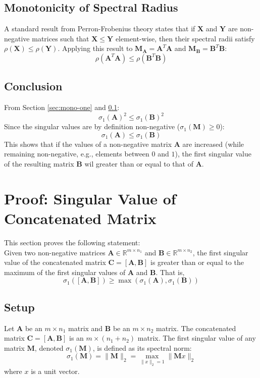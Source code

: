 \subsection{Monotonicity of Spectral Radius}
\label{sec:mono-three}
A standard result from Perron-Frobenius theory states that if $\mathbf{X}$ and
$\mathbf{Y}$ are non-negative matrices such that $\mathbf{X} \leq \mathbf{Y}$
element-wise, then their spectral radii satisfy $\rho(\mathbf{X}) \leq
\rho(\mathbf{Y})$. Applying this result to $\mathbf{M}_{\mathbf{A}} =
\mathbf{A}^T\mathbf{A}$ and $\mathbf{M}_{\mathbf{B}} =
\mathbf{B}^T\mathbf{B}$:
\[ \rho(\mathbf{A}^T\mathbf{A}) \leq \rho(\mathbf{B}^T\mathbf{B}) \]

\subsection{Conclusion}
From Section \ref{sec:mono-one} and \ref{sec:mono-three}:
\[ \sigma_1(\mathbf{A})^2 \leq \sigma_1(\mathbf{B})^2 \]
Since the singular values are by definition non-negative ($\sigma_1(\mathbf{M})
\geq 0$):
\[ \sigma_1(\mathbf{A}) \leq \sigma_1(\mathbf{B}) \]
This shows that if the values of a non-negative matrix $\mathbf{A}$ are
increased (while remaining non-negative, e.g., elements between $0$ and $1$),
the first singular value of the resulting matrix $\mathbf{B}$ wil greater than
or equal to that of $\mathbf{A}$.

\section{Proof: Singular Value of Concatenated Matrix}
\label{sec:app-concatenate}
This section proves the following statement:\\
Given two non-negative matrices $\mathbf{A} \in \mathbb{R}^{m \times n_1}$ and
$\mathbf{B} \in \mathbb{R}^{m \times n_2}$, the first singular value of the
concatenated matrix $\mathbf{C} = [\mathbf{A}, \mathbf{B}]$ is greater than or
equal to the maximum of the first singular values of $\mathbf{A}$ and
$\mathbf{B}$. That is,
\[ \sigma_1([\mathbf{A}, \mathbf{B}]) \geq \max(\sigma_1(\mathbf{A}),
\sigma_1(\mathbf{B})) \]

\subsection{Setup}
Let $\mathbf{A}$ be an $m \times n_1$ matrix and $\mathbf{B}$ be an $m \times
n_2$ matrix. The concatenated matrix $\mathbf{C} = [\mathbf{A}, \mathbf{B}]$ is
an $m \times (n_1 + n_2)$ matrix. The first singular value of any matrix
$\mathbf{M}$, denoted $\sigma_1(\mathbf{M})$, is defined as its spectral norm:
\[ \sigma_1(\mathbf{M}) = \parallel \mathbf{M} \parallel_2 = \max_{\parallel x
\parallel_2 = 1} \parallel \mathbf{M}x \parallel_2 \]
where $x$ is a unit vector.

